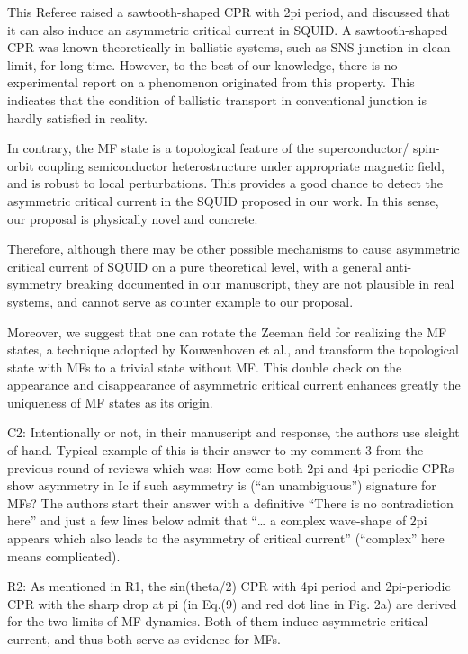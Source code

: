 \documentclass[11pt]{article}
\begin{document}
This Referee raised a sawtooth-shaped CPR with 2pi period, and discussed
that it can also induce an asymmetric critical current in SQUID. A
sawtooth-shaped CPR was known theoretically in ballistic systems, such
as SNS junction in clean limit, for long time. However, to the best of
our knowledge, there is no experimental report on a phenomenon
originated from this property. This indicates that the condition of
ballistic transport in conventional junction is hardly satisfied in
reality.

In contrary, the MF state is a topological feature of the
superconductor/ spin-orbit coupling semiconductor heterostructure under
appropriate magnetic field, and is robust to local perturbations. This
provides a good chance to detect the asymmetric critical current in the
SQUID proposed in our work. In this sense, our proposal is physically
novel and concrete.

Therefore, although there may be other possible mechanisms to cause
asymmetric critical current of SQUID on a pure theoretical level, with a
general anti-symmetry breaking documented in our manuscript, they are
not plausible in real systems, and cannot serve as counter example to
our proposal.

Moreover, we suggest that one can rotate the Zeeman field for realizing
the MF states, a technique adopted by Kouwenhoven et al., and transform
the topological state with MFs to a trivial state without MF. This
double check on the appearance and disappearance of asymmetric critical
current enhances greatly the uniqueness of MF states as its origin.

C2: Intentionally or not, in their manuscript and response, the authors
use sleight of hand. Typical example of this is their answer to my
comment 3 from the previous round of reviews which was: How come both
2pi and 4pi periodic CPRs show asymmetry in Ic if such asymmetry is
(``an unambiguous'') signature for MFs? The authors start their answer
with a definitive ``There is no contradiction here'' and just a few
lines below admit that ``\ldots{} a complex wave-shape of 2pi appears
which also leads to the asymmetry of critical current'' (``complex''
here means complicated).

R2: As mentioned in R1, the sin(theta/2) CPR with 4pi period and
2pi-periodic CPR with the sharp drop at pi (in Eq.(9) and red dot line
in Fig. 2a) are derived for the two limits of MF dynamics. Both of them
induce asymmetric critical current, and thus both serve as evidence for
MFs.
\end{document}

